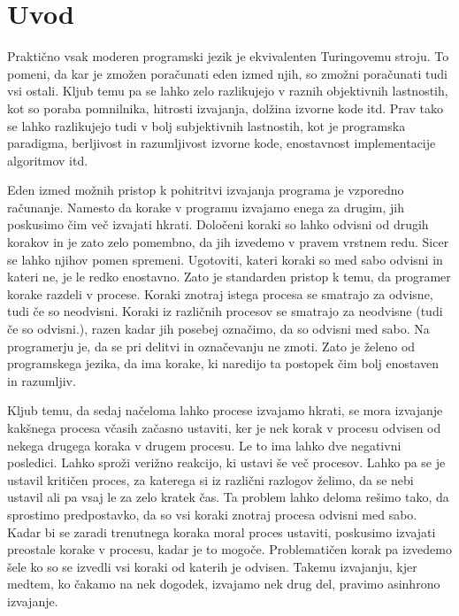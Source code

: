 \section{Uvod} \label{sec:uvod}


Praktično vsak moderen programski jezik je ekvivalenten Turingovemu stroju. To pomeni, da kar je zmožen poračunati eden izmed njih, so zmožni poračunati tudi vsi ostali. Kljub temu pa se lahko zelo razlikujejo v raznih objektivnih lastnostih, kot so poraba pomnilnika, hitrosti izvajanja, dolžina izvorne kode itd. Prav tako se lahko razlikujejo tudi v bolj subjektivnih lastnostih, kot je programska paradigma, berljivost in razumljivost izvorne kode, enostavnost implementacije algoritmov itd.

Eden izmed možnih pristop k pohitritvi izvajanja programa je vzporedno računanje. Namesto da korake v programu izvajamo enega za drugim, jih poskusimo čim več izvajati hkrati. Določeni koraki so lahko odvisni od drugih korakov in je zato zelo pomembno, da jih izvedemo v pravem vrstnem redu. Sicer se lahko njihov pomen spremeni. Ugotoviti, kateri koraki so med sabo odvisni in kateri ne, je le redko enostavno. Zato je standarden pristop k temu, da programer korake razdeli v procese. Koraki znotraj istega procesa se smatrajo za odvisne, tudi če so neodvisni. Koraki iz različnih procesov se smatrajo za neodvisne (tudi če so odvisni.), razen kadar jih posebej označimo, da so odvisni med sabo.
Na programerju je, da se pri delitvi in označevanju ne zmoti. Zato je želeno od programskega jezika, da ima korake, ki naredijo ta postopek čim bolj enostaven in razumljiv.

Kljub temu, da sedaj načeloma lahko procese izvajamo hkrati, se mora izvajanje kakšnega procesa včasih začasno ustaviti, ker je nek korak v procesu odvisen od nekega drugega koraka v drugem procesu. Le to ima lahko dve negativni posledici. Lahko sproži verižno reakcijo, ki ustavi še več procesov. Lahko pa se je ustavil kritičen proces, za katerega si iz različni razlogov želimo, da se nebi ustavil ali pa vsaj le za zelo kratek čas.
Ta problem lahko deloma rešimo tako, da sprostimo predpostavko, da so vsi koraki znotraj procesa odvisni med sabo. Kadar bi se zaradi trenutnega koraka moral proces ustaviti, poskusimo izvajati preostale korake v procesu, kadar je to mogoče. Problematičen korak pa izvedemo šele ko so se izvedli vsi koraki od katerih je odvisen. Takemu izvajanju, kjer medtem, ko čakamo na nek dogodek, izvajamo nek drug del, pravimo asinhrono izvajanje. 

